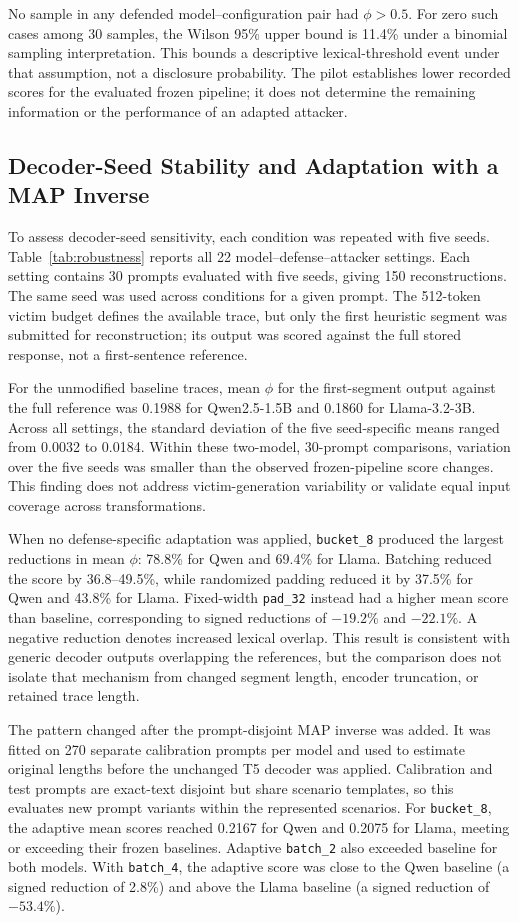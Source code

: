 \documentclass[electronics,article,submit,pdftex,moreauthors]{Definitions/mdpi}
\begin{document}
No sample in any defended model--configuration pair had $\phi>0.5$. For zero such cases among 30 samples, the Wilson 95\% upper bound is 11.4\% under a binomial sampling interpretation. This bounds a descriptive lexical-threshold event under that assumption, not a disclosure probability. The pilot establishes lower recorded scores for the evaluated frozen pipeline; it does not determine the remaining information or the performance of an adapted attacker.

\subsection{Decoder-Seed Stability and Adaptation with a MAP Inverse}\label{sec:robustness}
To assess decoder-seed sensitivity, each condition was repeated with five seeds. Table~\ref{tab:robustness} reports all 22 model--defense--attacker settings. Each setting contains 30 prompts evaluated with five seeds, giving 150 reconstructions. The same seed was used across conditions for a given prompt. The 512-token victim budget defines the available trace, but only the first heuristic segment was submitted for reconstruction; its output was scored against the full stored response, not a first-sentence reference.

For the unmodified baseline traces, mean $\phi$ for the first-segment output against the full reference was 0.1988 for Qwen2.5-1.5B and 0.1860 for Llama-3.2-3B. Across all settings, the standard deviation of the five seed-specific means ranged from 0.0032 to 0.0184. Within these two-model, 30-prompt comparisons, variation over the five seeds was smaller than the observed frozen-pipeline score changes. This finding does not address victim-generation variability or validate equal input coverage across transformations.

When no defense-specific adaptation was applied, \texttt{bucket\_8} produced the largest reductions in mean $\phi$: 78.8\% for Qwen and 69.4\% for Llama. Batching reduced the score by 36.8--49.5\%, while randomized padding reduced it by 37.5\% for Qwen and 43.8\% for Llama. Fixed-width \texttt{pad\_32} instead had a higher mean score than baseline, corresponding to signed reductions of $-19.2\%$ and $-22.1\%$. A negative reduction denotes increased lexical overlap. This result is consistent with generic decoder outputs overlapping the references, but the comparison does not isolate that mechanism from changed segment length, encoder truncation, or retained trace length.

The pattern changed after the prompt-disjoint MAP inverse was added. It was fitted on 270 separate calibration prompts per model and used to estimate original lengths before the unchanged T5 decoder was applied. Calibration and test prompts are exact-text disjoint but share scenario templates, so this evaluates new prompt variants within the represented scenarios. For \texttt{bucket\_8}, the adaptive mean scores reached 0.2167 for Qwen and 0.2075 for Llama, meeting or exceeding their frozen baselines. Adaptive \texttt{batch\_2} also exceeded baseline for both models. With \texttt{batch\_4}, the adaptive score was close to the Qwen baseline (a signed reduction of 2.8\%) and above the Llama baseline (a signed reduction of $-53.4\%$).
\end{document}
